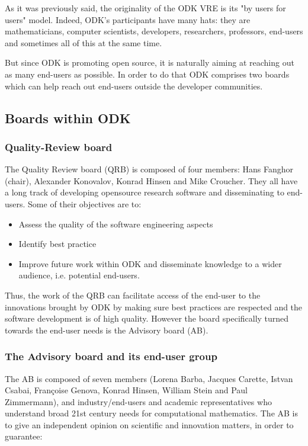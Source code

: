 \documentclass{deliverablereport}
\begin{document}
As it was previously said, the originality of the ODK VRE is its "by users for users" model. Indeed, ODK's participants have many hats: they are mathematicians, computer scientists, developers, researchers, professors, end-users and sometimes all of this at the same time. 

But since ODK is promoting open source, it is naturally aiming at reaching out as many end-users as possible. In order to do that ODK comprises two boards which can help reach out end-users outside the developer communities.

\subsection{Boards within ODK}

\subsubsection{Quality-Review board}

The Quality Review board (QRB) is composed of four members: Hans
Fanghor (chair), Alexander Konovalov, Konrad Hinsen and Mike
Croucher. They all have a long track of developing opensource research
software and disseminating to end-users. Some of their objectives are
to:

\begin{itemize}
\item{Assess the quality of the software engineering aspects}
\item{Identify best practice}
\item{Improve future work within ODK and disseminate knowledge to a wider audience, i.e. potential end-users.}
\end{itemize}

Thus, the work of the QRB can facilitate access of the end-user to the
innovations brought by ODK by making sure best practices are
respected and the software development is of high quality. However the
board specifically turned towards the end-user needs is the Advisory
board (AB).

\subsubsection{The Advisory board and its end-user group}

The AB is composed of seven members (Lorena Barba, Jacques Carette,
Istvan Csabai, Françoise Genova, Konrad Hinsen, William Stein and Paul
Zimmermann), and industry/end-users and academic representatives who
understand broad 21st century needs for computational mathematics.
The AB is to give an independent opinion on scientific and innovation
matters, in order to guarantee:
\end{document}

